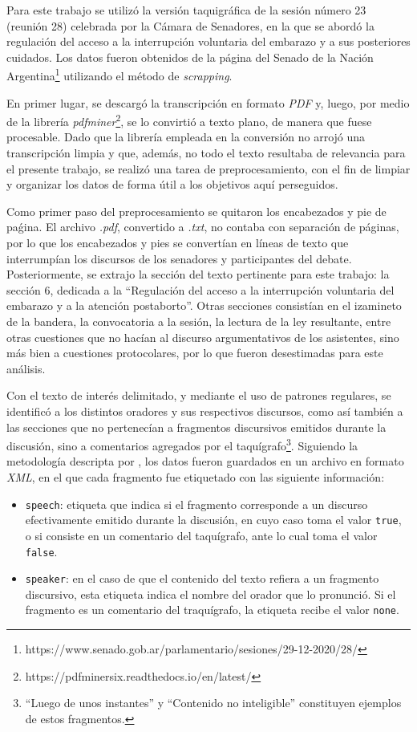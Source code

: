Para este trabajo se utilizó la versión taquigráfica de la sesión número
23 (reunión 28) celebrada por la Cámara de Senadores, en la que se abordó la
regulación del acceso a la interrupción voluntaria del embarazo y a sus
posteriores cuidados. Los datos fueron obtenidos de la página del Senado de la Nación
Argentina\footnote{https://www.senado.gob.ar/parlamentario/sesiones/29-12-2020/28/}
utilizando el método de \textit{scrapping}.\par
En primer lugar, se descargó la transcripción en formato \textit{PDF} y, luego, por
medio de la librería \textit{pdfminer}\footnote{https://pdfminersix.readthedocs.io/en/latest/},
se lo convirtió a texto plano, de manera que fuese procesable. Dado que la librería
empleada en la conversión no arrojó una transcripción limpia y que, además, no todo el texto
resultaba de relevancia para el presente trabajo, se realizó una tarea de
preprocesamiento, con el fin de limpiar y organizar los datos de forma útil a los
objetivos aquí perseguidos.\par
Como primer paso del preprocesamiento se quitaron los encabezados y pie de paǵina.
El archivo \textit{.pdf}, convertido a \textit{.txt}, no contaba con separación de
páginas, por lo que los encabezados y pies se convertían en líneas de texto que
interrumpían los discursos de los senadores y participantes del debate.
Posteriormente, se extrajo la sección del texto pertinente para este trabajo:
la sección 6, dedicada a la ``Regulación  del  acceso  a  la  interrupción
voluntaria  del  embarazo  y  a  la atención postaborto''. Otras secciones consistían
en el izamineto de la bandera, la convocatoria a la sesión, la lectura de la ley
resultante, entre otras cuestiones que no hacían al discurso argumentativos de los
asistentes, sino más bien a cuestiones protocolares, por lo que fueron desestimadas
para este análisis.\par
Con el texto de interés delimitado, y mediante el uso de patrones regulares, se
identificó a los distintos oradores y sus respectivos discursos, como así también
a las secciones que no pertenecían a fragmentos discursivos emitidos durante la
discusión, sino a comentarios agregados por el taquígrafo\footnote{``Luego de unos
instantes'' y ``Contenido no inteligible'' constituyen ejemplos de estos
fragmentos.}. Siguiendo la metodología descripta por \cite{monroe2008fightin},
los datos fueron guardados en un archivo en formato \textit{XML}, en el que
cada fragmento fue etiquetado con las siguiente información:
\begin{itemize}
    \item \texttt{speech}: etiqueta que indica si el fragmento corresponde a un
    discurso efectivamente emitido durante la discusión, en cuyo caso toma el
    valor \texttt{true}, o si consiste en un comentario del taquígrafo, ante lo cual
    toma el valor \texttt{false}.
    \item \texttt{speaker}: en el caso de que el contenido del texto refiera a
    un fragmento discursivo, esta etiqueta indica el nombre del orador que lo
    pronunció. Si el fragmento es un comentario del traquígrafo, la etiqueta
    recibe el valor \texttt{none}.
\end{itemize}
